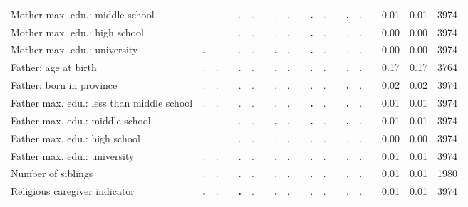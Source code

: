 \begin{tabular}{l c c c c c c c c c c c c c c c c c c}
Mother max. edu.: middle school &         . &         . & &         . &         . & &         . &         . & & \textbf{        .} &         . & & \textbf{        .} &         . & &      0.01 &      0.01 &      3974 \\
Mother max. edu.: high school &         . &         . & &         . &         . & &         . &         . & & \textbf{        .} &         . & &         . &         . & &      0.00 &      0.00 &      3974 \\
Mother max. edu.: university & \textbf{        .} &         . & &         . &         . & & \textbf{        .} &         . & & \textbf{        .} &         . & &         . &         . & &      0.00 &      0.00 &      3974 \\
Father: age at birth &         . &         . & &         . &         . & & \textbf{        .} &         . & &         . &         . & &         . &         . & &      0.17 &      0.17 &      3764 \\
Father: born in province &         . &         . & &         . &         . & &         . &         . & &         . &         . & & \textbf{        .} &         . & &      0.02 &      0.02 &      3974 \\
Father max. edu.: less than middle school &         . &         . & &         . &         . & &         . &         . & & \textbf{        .} &         . & & \textbf{        .} &         . & &      0.01 &      0.01 &      3974 \\
Father max. edu.: middle school &         . &         . & &         . &         . & & \textbf{        .} &         . & & \textbf{        .} &         . & & \textbf{        .} &         . & &      0.01 &      0.01 &      3974 \\
Father max. edu.: high school &         . &         . & &         . &         . & &         . &         . & &         . &         . & &         . &         . & &      0.00 &      0.00 &      3974 \\
Father max. edu.: university &         . &         . & &         . &         . & & \textbf{        .} &         . & &         . &         . & &         . &         . & &      0.01 &      0.01 &      3974 \\
Number of siblings &         . &         . & &         . &         . & &         . &         . & &         . &         . & &         . &         . & &      0.01 &      0.01 &      1980 \\
Religious caregiver indicator & \textbf{        .} &         . & & \textbf{        .} &         . & & \textbf{        .} &         . & &         . &         . & &         . &         . & &      0.01 &      0.01 &      3974 \\

\end{tabular}
